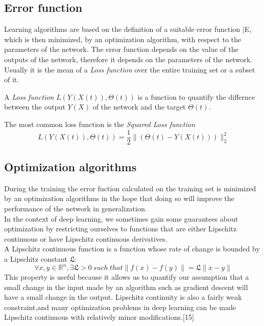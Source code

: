 \subsection{Error function}

Learning algorithms are based on the definition of a suitable error function \bar{E}, which is then minimized, by an optimization algorithm, with respect to the parameters of the network.
The error function depends on the value of the outputs of the network, therefore it depends on the parameters of the network.
Usually it is the mean of a \emph{Loss function} over the entire training set or a subset of it.



\begin{defn}
	A \emph{Loss function} $L(Y(X(t) ), \Theta(t) )$ is a function to quantify the differnce between the output $Y(X)$ of the network and the target $\Theta(t)$.
\end{defn}
The most common loss function is the \emph{Squared Loss function}
$$L(Y(X(t) ), \Theta(t) )= \frac{1}{2} \parallel{(\Theta(t)-Y(X(t)) )}\parallel^2_2$$
\subsection{Optimization  algorithms}
During the training the error fuction calculated on the training set is minimized by an optimization algorithms in the hope that doing so will improve the performance of the network in generalization.\\
In the context of deep learning, we sometimes gain some guarantees about optimization by restricting ourselves to functions that are either Lipschitz continuous or have Lipschitz continuous derivatives.\\
A Lipschitz continuous function is a function whose rate of change is bounded by a Lipschitz constant $\mathfrak{L}$:
$$\forall x, y \in \mathbb{R}^n, \exists \mathfrak{L}>0\ such\ that \parallel f(x)-f(y) \parallel = \mathfrak{L}\parallel x-y \parallel$$
This property is useful because it allows us to quantify our assumption that a small change in the input made by an algorithm such as gradient descent will have a small change in the output. Lipschitz continuity is also a fairly weak constraint,and many optimization problems in deep learning can be made Lipschitz continuous with relatively minor modiﬁcations.[15]\\

